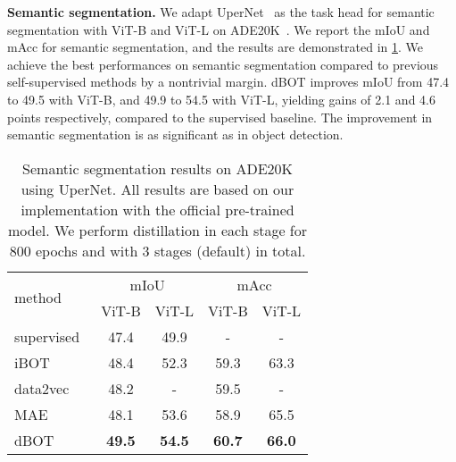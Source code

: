\documentclass[10pt,twocolumn,letterpaper]{article}
\renewcommand{\paragraph}[1]{\vspace{1.25mm}\noindent\textbf{#1}}
\def\ourmethod{{dBOT}\xspace}
\begin{document}
\paragraph{Semantic segmentation.}
We adapt UperNet~\cite{xiao2018unified} as the task head for semantic segmentation with ViT-B and ViT-L on ADE20K~\cite{ade}. 
We report the mIoU and mAcc for semantic segmentation, and the results are demonstrated in \cref{tab:ade20k}. 
We achieve the best performances on semantic segmentation compared to previous self-supervised methods by a nontrivial margin. 
\ourmethod improves mIoU from 47.4 to 49.5 with ViT-B, and 49.9 to 54.5 with ViT-L, yielding gains of 2.1 and 4.6 points respectively, compared to the supervised baseline.
The improvement in semantic segmentation is as significant as in object detection.

\begin{table}
    \begin{center}
    \setlength{\tabcolsep}{2.5mm}
    \begin{tabular}{l|cccc}
        \multirow{2}{*}{method}& \multicolumn{2}{c}{mIoU} & \multicolumn{2}{c}{mAcc}\\
        &ViT-B&ViT-L&ViT-B&ViT-L\\
        \hline
        \textcolor{gray!80}{supervised~\cite{mae}}&\textcolor{gray!80}{47.4}&\textcolor{gray!80}{49.9} & \textcolor{gray!80}{-} & \textcolor{gray!80}{-} \\
        iBOT~\cite{zhou2021ibot}&48.4&52.3 & 59.3 & 63.3\\
        data2vec\cite{baevski2022data2vec}&48.2&- & 59.5 &-\\
        MAE~\cite{mae}&48.1&53.6 & 58.9 & 65.5\\
        \hline
        \ourmethod&\textbf{49.5}&\textbf{54.5} & \textbf{60.7} & \textbf{66.0}\\
    \end{tabular}
    \end{center}
    \caption{Semantic segmentation results on ADE20K using UperNet. 
    All results are based on our implementation with the official pre-trained model.
    We perform distillation in each stage for 800 epochs and with 3 stages (default) in total. 
    }
    \label{tab:ade20k}
\vspace{-0.2cm}
\end{table}
\end{document}
